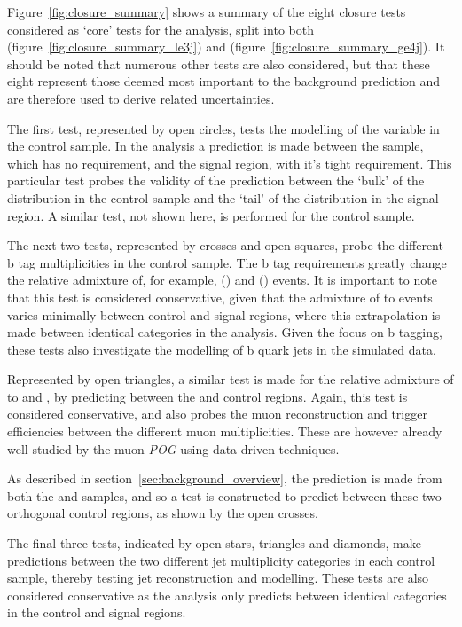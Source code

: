 Figure~\ref{fig:closure_summary} shows a summary of the eight closure tests 
considered as `core' tests for the analysis, split into both
\njlow (figure~\ref{fig:closure_summary_le3j}) 
and \njhigh (figure~\ref{fig:closure_summary_ge4j}). It should be noted that 
numerous other tests are also considered, but that these eight represent those 
deemed most important to the background prediction and are therefore used to
derive related uncertainties.

The first test, represented by open circles, tests the modelling of the \alphat 
variable in the \mj control sample. In the analysis a prediction is made 
between the \mj sample, which has no \alphat requirement, and the 
signal region, with it's tight \alphat requirement. This particular test probes
the validity of the prediction between the `bulk' of the \alphat distribution in
the control sample
and the `tail' of the distribution in the signal region. A similar test, not
shown here, is performed for the \mmj control sample.

The next two tests, represented by crosses and open squares, probe the
different b tag multiplicities in the \mj control sample. The b tag 
requirements greatly change the relative admixture of, for example, \wj ()
and \ttj () events.
It is important to note that this test is 
considered conservative, given that the admixture of \wj to \ttj events 
varies minimally between control and signal regions, where this extrapolation is 
made between identical \nb categories in the analysis. Given the focus on b
tagging, these tests also investigate the modelling of b quark jets in the
simulated data.

Represented by open triangles, a similar test is made for the relative
admixture of \zj to \wj and \ttj, by  predicting between the \mj and \mmj
control regions. Again, this test is considered conservative, and also probes
the muon reconstruction and trigger efficiencies between the different muon
multiplicities. These are however already well studied by the muon \emph{POG}
using data-driven techniques.

As described in section~\ref{sec:background_overview}, the \zinv prediction 
is made from both the \gj and \mmj samples, and so a test is constructed to 
predict between these two orthogonal control regions, as shown by the open 
crosses.

The final three tests, indicated by open stars, triangles and diamonds, make 
predictions between the two different jet multiplicity categories in each 
control sample, thereby 
testing jet reconstruction and modelling. These tests are also considered 
conservative as the analysis only predicts between identical \nj categories in 
the control and signal regions.

